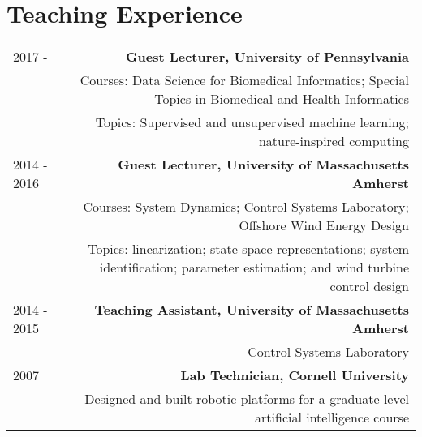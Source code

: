 \section*{Teaching Experience}
\begin{tabular}{L!{\VRule}R}
2017 - & {\bf Guest Lecturer, University of Pennsylvania}\\
& Courses: Data Science for Biomedical Informatics; Special Topics in Biomedical and Health Informatics \\
& Topics: Supervised and unsupervised machine learning; nature-inspired computing \\
2014 - 2016& {\bf Guest Lecturer, University of Massachusetts Amherst}\\
& Courses: System Dynamics; Control Systems Laboratory; Offshore Wind Energy Design\\
& Topics: linearization; state-space representations; system identification; parameter estimation; and wind turbine control design \\

2014 - 2015& {\bf Teaching Assistant, University of Massachusetts Amherst} \\
& Control Systems Laboratory \\
2007& {\bf Lab Technician, Cornell University}\\
& Designed and built robotic platforms for a graduate level artificial intelligence course\\
\end{tabular}
